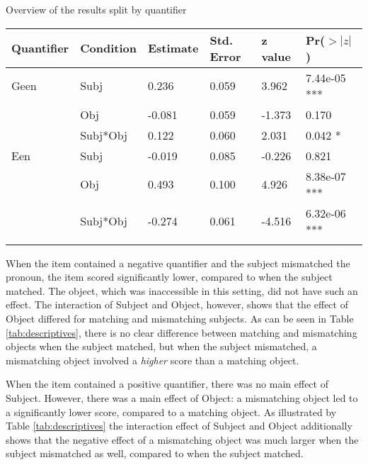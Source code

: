 \documentclass[11pt]{article} %
\begin{document}
\begin{threeparttable}
\caption{\label{tab:byquan}Overview of the results split by quantifier}
\begin{tabular}{llllll}
Quantifier	& Condition & Estimate & Std. Error & z value & Pr($>|z|$) \\
	\hline
Geen &Subj  &       0.236   & 0.059 & 3.962& 7.44e-05 ***\\
 &Obj    &        -0.081 &   0.059 &  -1.373 & 0.170 \\
 &Subj*Obj & 0.122   & 0.060  & 2.031  &0.042 *\\
\hline
Een&Subj &          -0.019    &0.085  & -0.226 &   0.821    \\
&Obj    &       0.493   & 0.100  &4.926 &8.38e-07 ***\\
&Subj*Obj& -0.274  &  0.061 &  -4.516 &6.32e-06 ***\\\\
\end{tabular}
\end{threeparttable}

When the item contained a negative quantifier and the subject mismatched the pronoun, the item scored significantly lower, compared to when the subject matched. The object, which was inaccessible in this setting, did not have such an effect. The interaction of Subject and Object, however, shows that the effect of Object differed for matching and mismatching subjects. As can be seen in Table \ref{tab:descriptives}, there is no clear difference between matching and mismatching objects when the subject matched, but when the subject mismatched, a mismatching object involved a \textit{higher} score than a matching object. 




When the item contained a positive quantifier, there was no main effect of Subject. However, there was a main effect of Object: a mismatching object led to a significantly lower score, compared to a matching object. As illustrated by Table \ref{tab:descriptives} the interaction effect of Subject and Object additionally shows that the negative effect of a mismatching object was much larger when the subject mismatched as well, compared to when the subject matched. 


\end{document}
